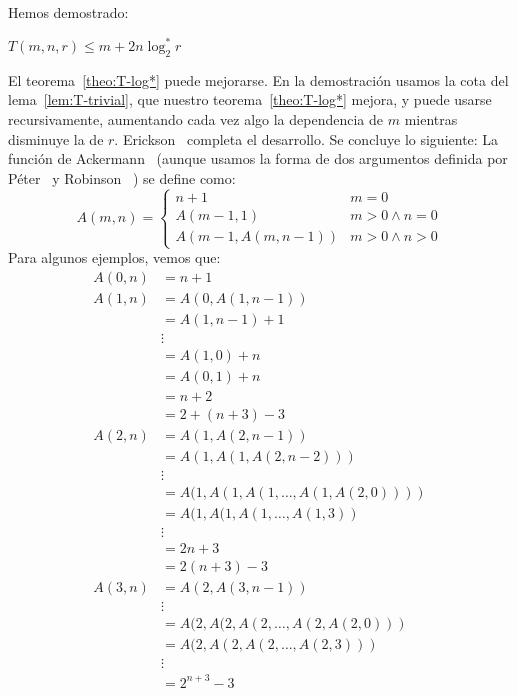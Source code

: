   Hemos demostrado:
  \begin{theorem}
    \label{theo:T-log*}
    \(T(m, n, r)
      \le m + 2 n \log_2^* r\)
  \end{theorem}

  El teorema~\ref{theo:T-log*} puede mejorarse.
  En la demostración usamos la cota del lema~\ref{lem:T-trivial},
  que nuestro teorema~\ref{theo:T-log*} mejora,
  y puede usarse recursivamente,
  aumentando cada vez algo la dependencia de \(m\)
  mientras disminuye la de \(r\).
  Erickson~%
    \cite[clase~17]{erickson19:_algorithms}
  completa el desarrollo.
  Se concluye lo siguiente:
  La función de Ackermann~%
    \cite{ackermann28:_zum_hilbert_aufbau_zahlen}
  (aunque usamos la forma de dos argumentos definida por Péter~%
     \cite{peter34:_konstruktion_nichtrekursiver_funktionen}
   y Robinson~%
     \cite{robinson48:_recursion_double_recursion})
  se define como:
  \begin{equation*}
    \label{eq:Ackermann}
    A(m, n)
      = \begin{cases}
          n + 1			 & m = 0 \\
          A(m - 1, 1)		 & m > 0 \wedge n = 0 \\
          A(m - 1, A(m, n - 1))	 & m > 0 \wedge n > 0
        \end{cases}
  \end{equation*}
  Para algunos ejemplos,
  vemos que:
  \begin{align*}
    A(0, n)
      &= n + 1 \\
    A(1, n)
      &= A(0, A(1, n - 1)) \\
      &= A(1, n - 1) + 1 \\
      &\vdots \\
      &= A(1, 0) + n \\
      &= A(0, 1) + n \\
      &= n + 2 \\
      &= 2 + (n + 3) - 3 \\
    A(2, n)
      &= A(1, A(2, n - 1)) \\
      &= A(1, A(1, A(2, n - 2))) \\
      &\vdots \\
      &= A(1, A(1, A(1, \dotsc, A(1, A(2, 0)))) \\
      &= A(1, A(1, A(1, \dotsc, A(1, 3)) \\
      &\vdots \\
      &= 2 n + 3 \\
      &= 2 (n + 3) - 3 \\
    A(3, n)
      &= A(2, A(3, n - 1)) \\
      &\vdots \\
      &= A(2, A(2, A(2, \dotsc, A(2, A(2, 0))) \\
      &= A(2, A(2, A(2, \dotsc, A(2, 3))) \\
      &\vdots \\
      &= 2^{n + 3} - 3
  \end{align*}

